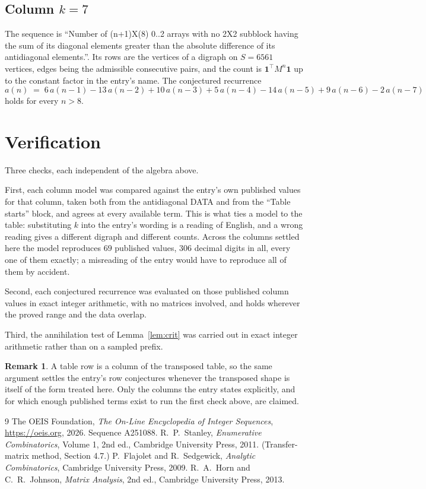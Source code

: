 \documentclass[11pt,a4paper]{article}
\theoremstyle{plain}
\theoremstyle{definition}
\newtheorem{remark}[theorem]{Remark}
\begin{document}
\subsection*{Column $k=7$}
The sequence is ``Number of (n+1)X(8) 0..2 arrays with no 2X2 subblock having the sum of its diagonal elements greater than the absolute difference of its antidiagonal elements.''. Its rows are the vertices of a digraph on
$S=6561$ vertices, edges being the admissible consecutive pairs, and the count is
$\mathbf{1}^{\!\top}M^{n}\mathbf{1}$ up to the constant factor in the entry's name.
The conjectured recurrence
\[
a(n)\;=\;6\,a(n-1) - 13\,a(n-2) + 10\,a(n-3) + 5\,a(n-4) - 14\,a(n-5) + 9\,a(n-6) - 2\,a(n-7)
\]
holds for every $n>8$.

\section{Verification}

Three checks, each independent of the algebra above.

First, each column model was compared against the entry's own published values for that
column, taken both from the antidiagonal DATA and from the ``Table starts'' block, and agrees
at every available term. This is what ties a model to the table: substituting $k$ into the
entry's wording is a reading of English, and a wrong reading gives a different digraph and
different counts. Across the columns settled here the model reproduces $69$ published
values, $306$ decimal digits in all, every one of them exactly; a misreading of the entry
would have to reproduce all of them by accident.

Second, each conjectured recurrence was evaluated on those published column values in exact
integer arithmetic, with no matrices involved, and holds wherever the proved range and the
data overlap.

Third, the annihilation test of Lemma~\ref{lem:crit} was carried out in exact integer
arithmetic rather than on a sampled prefix.

\begin{remark}
A table row is a column of the transposed table, so the same argument settles the entry's row
conjectures whenever the transposed shape is itself of the form treated here. Only the columns
the entry states explicitly, and for which enough published terms exist to run the first check
above, are claimed.
\end{remark}

\begin{thebibliography}{9}
 The OEIS Foundation, \emph{The On-Line Encyclopedia of Integer
Sequences}, \url{https://oeis.org}, 2026. Sequence A251088.
 R.~P.~Stanley, \emph{Enumerative Combinatorics}, Volume 1, 2nd ed.,
Cambridge University Press, 2011. (Transfer-matrix method, Section 4.7.)
 P.~Flajolet and R.~Sedgewick, \emph{Analytic Combinatorics}, Cambridge
University Press, 2009.
 R.~A.~Horn and C.~R.~Johnson, \emph{Matrix Analysis}, 2nd ed., Cambridge
University Press, 2013.
\end{thebibliography}
\end{document}
